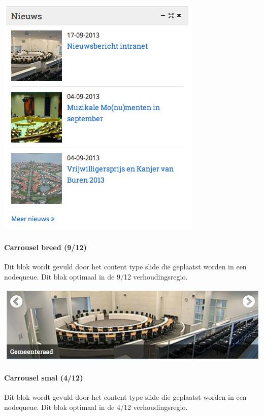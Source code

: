 \begin{center}
	\includegraphics[scale=0.5]{img/blokken/nieuwsteaserimg.png}
\end{center}

\paragraph{Carrousel breed (9/12)}

Dit blok wordt gevuld door het content type slide die geplaatst worden in een nodequeue. Dit blok optimaal in de 9/12 verhoudingsregio.

\begin{center}
	\includegraphics[scale=0.5]{img/blokken/carrouselbreed.png}
\end{center}

\paragraph{Carrousel smal (4/12)}

Dit blok wordt gevuld door het content type slide die geplaatst worden in een nodequeue. Dit blok optimaal in de 4/12 verhoudingsregio.

